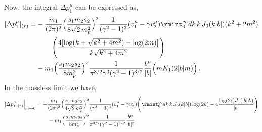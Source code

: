 Now, the integral $\Delta p_1^{\mu}$ can be expressed as,
\begin{align}
\begin{split} \label{eee22}
[\Delta p_1^{\mu}]_{(r)} =&-\frac{m_1}{(2\pi)^2}\Big(\frac{s_1m_2 s_2}{8\sqrt{2}\,m_p^2}\Big)^2\frac{1}{(\gamma^2-1)^3}(v_1^\mu-\gamma v_2^\mu)\rmint_{0}^{\infty}{d}k\,k\, J_{0}(k|b|)(k^2+2m^2)
      \\&\hspace{0.8cm} \Bigg( \frac{4[\log(k+\sqrt{k^2+4m^2})-\log(2m)]}{k\sqrt{k^2+4m^2}}\Bigg)\\ &
      \hspace{0 cm}-m_1\Big(\frac{s_1m_2 s_2}{8m_p^2}\Big)^2\frac{1}{\pi^{3/2}\gamma^3(\gamma^2-1)^{3/2}} \frac{b^\mu}{|b|}\Big(m K_1(2 |b| m)\Big)\,.
\end{split}
\end{align}
In the massless limit we have,
\begin{align}
    \begin{split}
     [\Delta p_1^{\mu}]_{(r)} \Big|_{m\to 0}&= -\frac{m_1}{(2\pi)^2}\Big(\frac{s_1m_2 s_2}{4\sqrt{2}\,m_p^2}\Big)^2\frac{1}{(\gamma^2-1)^3}(v_1^\mu-\gamma v_2^\mu)\Bigg(\rmint_{0}^{\infty}dk \, k\,J_{0}(k|b|) \log(2 k)-4\frac
     {\log(2\epsilon)J_{1}(|b|\Lambda)}{|b|}\Bigg)\\ &
       \hspace{0.8cm}-m_1\Big(\frac{s_1m_2 s_2}{8m_p^2}\Big)^2\frac{1}{\pi^{3/2}(\gamma^2-1)^{3/2}} \frac{b^\mu}{|b|^2}
    \end{split}
\end{align}
